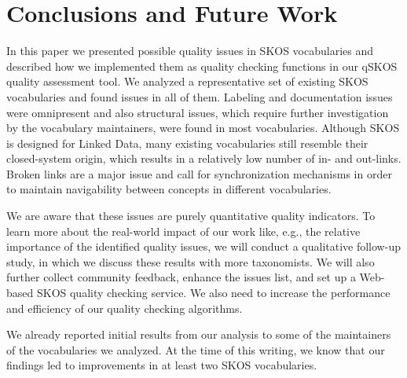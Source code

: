 \section{Conclusions and Future Work}\label{sec:conclusions}

In this paper we presented possible quality issues in SKOS vocabularies and described how we implemented them as quality checking functions in our qSKOS quality assessment tool. We analyzed a representative set of existing SKOS vocabularies and found  issues in all of them. Labeling and documentation issues were omnipresent and also structural issues, which require further investigation by the vocabulary maintainers, were found in most vocabularies. Although SKOS is designed for Linked Data, many existing vocabularies still resemble their closed-system origin, which results in a relatively low number of in- and out-links. Broken links are a major issue and call for synchronization mechanisms in order to maintain navigability between concepts in different vocabularies.

We are aware that these issues are purely quantitative quality indicators. To learn more about the real-world impact of our work like, e.g., the relative importance of the identified quality issues, we will conduct a qualitative follow-up study, in which we discuss these results with more taxonomists. We will also further collect community feedback, enhance the issues list, and set up a Web-based SKOS quality checking service. We also need to increase the performance and efficiency of our quality checking algorithms.

We already reported initial results from our analysis to some of the maintainers of the vocabularies we analyzed. At the time of this writing, we know that our findings led to improvements in at least two SKOS vocabularies.

